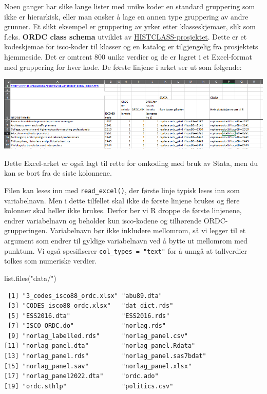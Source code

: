 \documentclass[
  letterpaper,
  DIV=11,
  numbers=noendperiod]{scrreprt}
\newenvironment{Shaded}{\begin{snugshade}}{\end{snugshade}}
\newcommand{\FunctionTok}[1]{\textcolor[rgb]{0.28,0.35,0.67}{#1}}
\newcommand{\NormalTok}[1]{\textcolor[rgb]{0.00,0.23,0.31}{#1}}
\newcommand{\StringTok}[1]{\textcolor[rgb]{0.13,0.47,0.30}{#1}}
\theoremstyle{definition}
\theoremstyle{remark}
\begin{document}
Noen ganger har slike lange lister med unike koder en standard
gruppering som ikke er hierarkisk, eller man ønsker å lage en annen type
gruppering av andre grunner. Et slikt eksempel er gruppering av yrker
etter klasseskjemaer, slik som f.eks. \textbf{ORDC class schema}
utviklet av
\href{https://www.sv.uio.no/iss/english/research/projects/histclass/}{HISTCLASS-prosjektet}.
Dette er et kodeskjemae for isco-koder til klasser og en katalog er
tilgjengelig fra prosjektets hjemmeside. Det er omtrent 800 unike
verdier og de er lagret i et Excel-format med gruppering for hver kode.
De første linjene i arket ser ut som følgende:

\includegraphics{./images/isco_excel.png}

Dette Excel-arket er også lagt til rette for omkoding med bruk av Stata,
men du kan se bort fra de siste kolonnene.

Filen kan leses inn med \texttt{read\_excel()}, der første linje typisk
leses inn som variabelnavn. Men i dette tilfellet skal ikke de første
linjene brukes og flere kolonner skal heller ikke brukes. Derfor ber vi
R droppe de første linjenene, endrer variabelnavn og beholder kun
isco-kodene og tilhørende ORDC-grupperingen. Variabelnavn bør ikke
inkludere mellomrom, så vi legger til et argument som endrer til gyldige
variabelnavn ved å bytte ut mellomrom med punktum. Vi også spesifiserer
\texttt{col\_types\ =\ "text"} for å unngå at tallverdier tolkes som
numeriske verdier.

\begin{Shaded}
\begin{Highlighting}[]
\FunctionTok{list.files}\NormalTok{(}\StringTok{"data/"}\NormalTok{)}
\end{Highlighting}
\end{Shaded}

\begin{verbatim}
 [1] "3_codes_isco88_ordc.xlsx" "abu89.dta"               
 [3] "CODES_isco88_ordc.xlsx"   "dat_dict.rds"            
 [5] "ESS2016.dta"              "ESS2016.rds"             
 [7] "ISCO_ORDC.do"             "norlag.rds"              
 [9] "norlag_labelled.rds"      "norlag_panel.csv"        
[11] "norlag_panel.dta"         "norlag_panel.Rdata"      
[13] "norlag_panel.rds"         "norlag_panel.sas7bdat"   
[15] "norlag_panel.sav"         "norlag_panel.xlsx"       
[17] "norlag_panel2022.dta"     "ordc.ado"                
[19] "ordc.sthlp"               "politics.csv"            
\end{verbatim}
\end{document}
